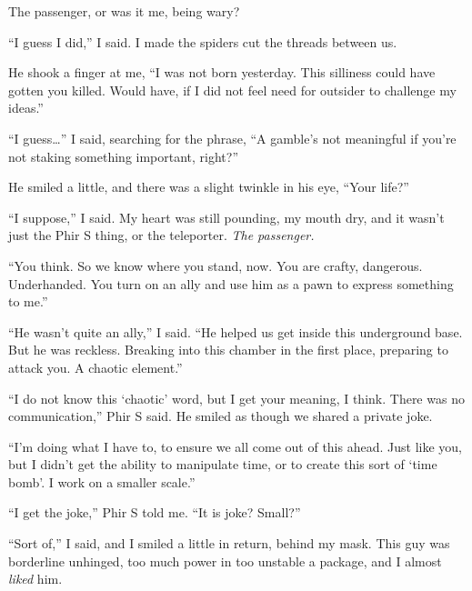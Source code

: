 The passenger, or was it me, being wary?



``I guess I did,'' I said.  I made the spiders cut the threads between us.



He shook a finger at me, ``I was not born yesterday.  This silliness could have gotten you killed.  Would have, if I did not feel need for outsider to challenge my ideas.''



``I guess\ldots'' I said, searching for the phrase, ``A gamble's not meaningful if you're not staking something important, right?''



He smiled a little, and there was a slight twinkle in his eye, ``Your life?''



``I suppose,'' I said.  My heart was still pounding, my mouth dry, and it wasn't just the Phir S thing, or the teleporter.  \emph{The passenger.}



``You think.  So we know where you stand, now.  You are crafty, dangerous.  Underhanded.  You turn on an ally and use him as a pawn to express something to me.''



``He wasn't quite an ally,'' I said.  ``He helped us get inside this underground base.  But he was reckless.  Breaking into this chamber in the first place, preparing to attack you.  A chaotic element.''



``I do not know this `chaotic' word, but I get your meaning, I think.  There was no communication,'' Phir S said.  He smiled as though we shared a private joke.



``I'm doing what I have to, to ensure we all come out of this ahead.  Just like you, but I didn't get the ability to manipulate time, or to create this sort of `time bomb'.  I work on a smaller scale.''



``I get the joke,'' Phir S told me.  ``It is joke?  Small?''



``Sort of,'' I said, and I smiled a little in return, behind my mask.  This guy was borderline unhinged, too much power in too unstable a package, and I almost \emph{liked} him.



